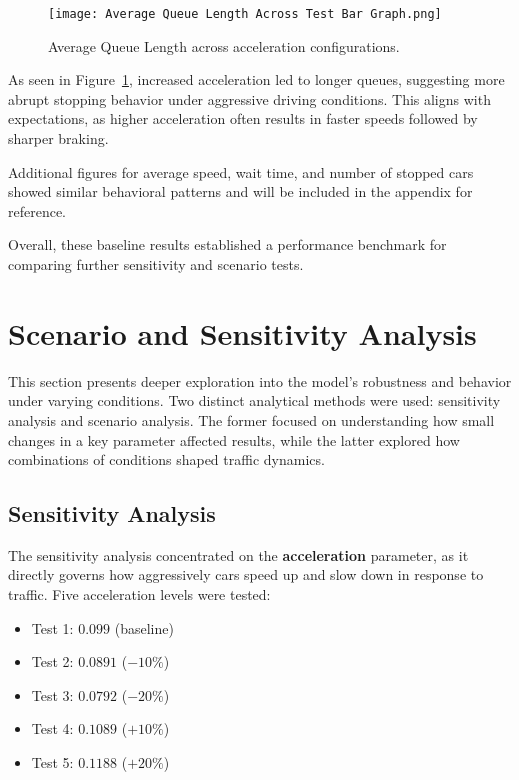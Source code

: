 \documentclass[12pt]{article}
\begin{document}
\vspace{1em}
\begin{figure}[H]
    \centering
    \texttt{[image: Average Queue Length Across Test Bar Graph.png]}
    \caption{Average Queue Length across acceleration configurations.}
    \label{fig:avg-queue-length-m5}
\end{figure}

\noindent As seen in Figure~\ref{fig:avg-queue-length-m5}, increased acceleration led to longer queues, suggesting more abrupt stopping behavior under aggressive driving conditions. This aligns with expectations, as higher acceleration often results in faster speeds followed by sharper braking.

Additional figures for average speed, wait time, and number of stopped cars showed similar behavioral patterns and will be included in the appendix for reference.

Overall, these baseline results established a performance benchmark for comparing further sensitivity and scenario tests.

\newpage
\section{Scenario and Sensitivity Analysis}

This section presents deeper exploration into the model's robustness and behavior under varying conditions. Two distinct analytical methods were used: sensitivity analysis and scenario analysis. The former focused on understanding how small changes in a key parameter affected results, while the latter explored how combinations of conditions shaped traffic dynamics.

\subsection{Sensitivity Analysis}

The sensitivity analysis concentrated on the \textbf{acceleration} parameter, as it directly governs how aggressively cars speed up and slow down in response to traffic. Five acceleration levels were tested:

\begin{itemize}
    \item Test 1: $0.099$ (baseline)
    \item Test 2: $0.0891$ ($-10\%$)
    \item Test 3: $0.0792$ ($-20\%$)
    \item Test 4: $0.1089$ ($+10\%$)
    \item Test 5: $0.1188$ ($+20\%$)
\end{itemize}
\end{document}
